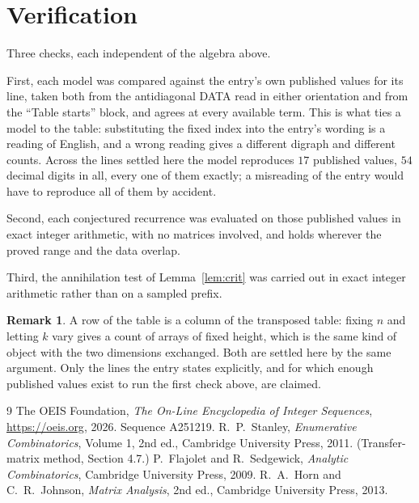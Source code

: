 \documentclass[11pt,a4paper]{article}
\theoremstyle{plain}
\theoremstyle{definition}
\newtheorem{remark}[theorem]{Remark}
\begin{document}
\section{Verification}

Three checks, each independent of the algebra above.

First, each model was compared against the entry's own published values for its line, taken
both from the antidiagonal DATA read in either orientation and from the ``Table starts''
block, and agrees at every available term. This is what ties a model to the table:
substituting the fixed index into the entry's wording is a reading of English, and a wrong
reading gives a different digraph and different counts. Across the lines settled here the
model reproduces $17$ published values, $54$ decimal digits in all, every one of
them exactly; a misreading of the entry would have to reproduce all of them by accident.

Second, each conjectured recurrence was evaluated on those published values in exact
integer arithmetic, with no matrices involved, and holds wherever the proved range and the
data overlap.

Third, the annihilation test of Lemma~\ref{lem:crit} was carried out in exact integer
arithmetic rather than on a sampled prefix.

\begin{remark}
A row of the table is a column of the transposed table: fixing $n$ and letting $k$ vary gives a
count of arrays of fixed height, which is the same kind of object with the two dimensions
exchanged. Both are settled here by the same argument. Only the lines the entry states
explicitly, and for which enough published values exist to run the first check above, are
claimed.
\end{remark}

\begin{thebibliography}{9}
 The OEIS Foundation, \emph{The On-Line Encyclopedia of Integer
Sequences}, \url{https://oeis.org}, 2026. Sequence A251219.
 R.~P.~Stanley, \emph{Enumerative Combinatorics}, Volume 1, 2nd ed.,
Cambridge University Press, 2011. (Transfer-matrix method, Section 4.7.)
 P.~Flajolet and R.~Sedgewick, \emph{Analytic Combinatorics}, Cambridge
University Press, 2009.
 R.~A.~Horn and C.~R.~Johnson, \emph{Matrix Analysis}, 2nd ed., Cambridge
University Press, 2013.
\end{thebibliography}
\end{document}
